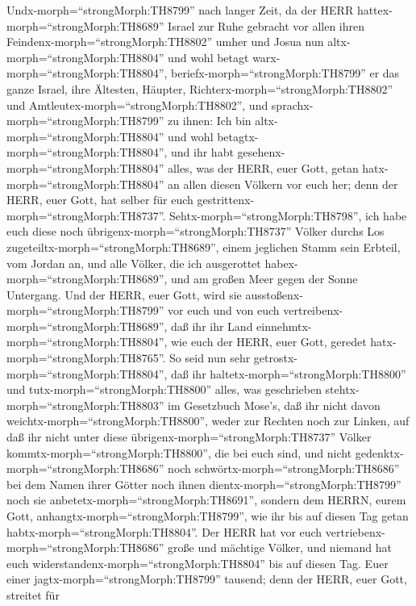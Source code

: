  Undx-morph=``strongMorph:TH8799'' nach langer Zeit, da der
HERR hattex-morph=``strongMorph:TH8689'' Israel zur Ruhe gebracht vor
allen ihren Feindenx-morph=``strongMorph:TH8802'' umher und Josua nun
altx-morph=``strongMorph:TH8804'' und wohl betagt
warx-morph=``strongMorph:TH8804'', 
beriefx-morph=``strongMorph:TH8799'' er das ganze Israel, ihre Ältesten,
Häupter, Richterx-morph=``strongMorph:TH8802'' und
Amtleutex-morph=``strongMorph:TH8802'', und
sprachx-morph=``strongMorph:TH8799'' zu ihnen: Ich bin
altx-morph=``strongMorph:TH8804'' und wohl
betagtx-morph=``strongMorph:TH8804'',  und ihr habt
gesehenx-morph=``strongMorph:TH8804'' alles, was der HERR, euer Gott,
getan hatx-morph=``strongMorph:TH8804'' an allen diesen Völkern vor euch
her; denn der HERR, euer Gott, hat selber für euch
gestrittenx-morph=``strongMorph:TH8737''. 
Sehtx-morph=``strongMorph:TH8798'', ich habe euch diese noch
übrigenx-morph=``strongMorph:TH8737'' Völker durchs Los
zugeteiltx-morph=``strongMorph:TH8689'', einem jeglichen Stamm sein
Erbteil, vom Jordan an, und alle Völker, die ich ausgerottet
habex-morph=``strongMorph:TH8689'', und am großen Meer gegen der Sonne
Untergang.  Und der HERR, euer Gott, wird sie
ausstoßenx-morph=``strongMorph:TH8799'' vor euch und von euch
vertreibenx-morph=``strongMorph:TH8689'', daß ihr ihr Land
einnehmtx-morph=``strongMorph:TH8804'', wie euch der HERR, euer Gott,
geredet hatx-morph=``strongMorph:TH8765''.  So seid nun sehr
getrostx-morph=``strongMorph:TH8804'', daß ihr
haltetx-morph=``strongMorph:TH8800'' und
tutx-morph=``strongMorph:TH8800'' alles, was geschrieben
stehtx-morph=``strongMorph:TH8803'' im Gesetzbuch Mose's, daß ihr nicht
davon weichtx-morph=``strongMorph:TH8800'', weder zur Rechten noch zur
Linken,  auf daß ihr nicht unter diese
übrigenx-morph=``strongMorph:TH8737'' Völker
kommtx-morph=``strongMorph:TH8800'', die bei euch sind, und nicht
gedenktx-morph=``strongMorph:TH8686'' noch
schwörtx-morph=``strongMorph:TH8686'' bei dem Namen ihrer Götter noch
ihnen dientx-morph=``strongMorph:TH8799'' noch sie
anbetetx-morph=``strongMorph:TH8691'',  sondern dem HERRN,
eurem Gott, anhangtx-morph=``strongMorph:TH8799'', wie ihr bis auf
diesen Tag getan habtx-morph=``strongMorph:TH8804''.  Der
HERR hat vor euch vertriebenx-morph=``strongMorph:TH8686'' große und
mächtige Völker, und niemand hat euch
widerstandenx-morph=``strongMorph:TH8804'' bis auf diesen Tag.
 Euer einer jagtx-morph=``strongMorph:TH8799'' tausend;
denn der HERR, euer Gott, streitet für
